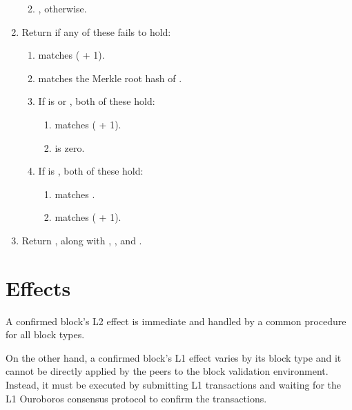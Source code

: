 \documentclass[../hydrozoa.tex]{subfiles}
\begin{document}
\begin{enumerate}
\begin{enumerate}
\begin{equation*}
        \end{equation*}
      \item {}, otherwise.
    \end{enumerate}
  \item Return  if any of these fails to hold:
    \begin{enumerate}
      \item {} matches ( + 1).
      \item {} matches the Merkle root hash of .
      \item If  is  or , both of these hold:
        \begin{enumerate}
          \item {} matches ( + 1).
          \item {} is zero.
        \end{enumerate}
      \item If  is , both of these hold:
        \begin{enumerate}
          \item {} matches .
          \item {} matches ( + 1).
        \end{enumerate}
    \end{enumerate}
  \item Return , along with , , and .
\end{enumerate}

\section{Effects}%
\label{h:l2-block-effect}%

A confirmed block's L2 effect is immediate and handled by a common procedure for all block types.

On the other hand, a confirmed block's L1 effect varies by its block type and it cannot be directly applied by the peers to the block validation environment.
Instead, it must be executed by submitting L1 transactions and waiting for the L1 Ouroboros consensus protocol to confirm the transactions.
\end{document}
